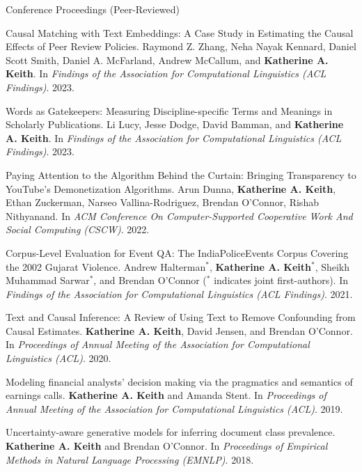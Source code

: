 \documentclass{resume} %
\begin{document}
\begin{rSection}{Conference Proceedings (Peer-Reviewed)}
\begin{etaremune}

\item Causal Matching with Text Embeddings: A Case Study in Estimating the Causal Effects of Peer Review Policies.
    Raymond Z. Zhang, Neha Nayak Kennard, 
    Daniel Scott Smith, Daniel A. McFarland, 
    Andrew McCallum, and \textbf{Katherine A. Keith}.
    In \emph{Findings of the Association for Computational Linguistics (ACL Findings)}. 2023.

\item Words as Gatekeepers: Measuring Discipline-specific
    Terms and Meanings in Scholarly Publications.
    Li Lucy, Jesse Dodge, David Bamman, and \textbf{Katherine A. Keith}.
    In \emph{Findings of the Association for Computational Linguistics (ACL Findings)}. 2023.

\item Paying Attention to the Algorithm Behind the Curtain: Bringing Transparency to YouTube's Demonetization Algorithms.
    Arun Dunna, \textbf{Katherine A. Keith}, Ethan Zuckerman, Narseo Vallina-Rodriguez, Brendan O'Connor, Rishab Nithyanand. 
    In \emph{ACM Conference On Computer-Supported Cooperative Work And Social Computing (CSCW)}. 2022. 

\item Corpus-Level Evaluation for Event QA: The IndiaPoliceEvents Corpus Covering the 2002 Gujarat Violence. Andrew Halterman$^*$, \textbf{Katherine A. Keith}$^*$, Sheikh Muhammad Sarwar$^*$, and Brendan O'Connor ($^*$ indicates joint first-authors).  In \emph{Findings of the Association for Computational Linguistics (ACL Findings)}. 2021.

\item Text and Causal Inference: A Review of Using Text to Remove Confounding from Causal Estimates. \textbf{Katherine A. Keith}, David Jensen, and Brendan O'Connor. In \emph{Proceedings of Annual Meeting of the Association for Computational Linguistics (ACL)}. 2020.  

\item Modeling financial analysts' decision making via the pragmatics and semantics of earnings calls. 
\textbf{Katherine A. Keith} and Amanda Stent. 
In \emph{Proceedings of Annual Meeting of the Association for Computational Linguistics (ACL)}.  2019. 

\item Uncertainty-aware generative models for inferring document class prevalence.
\textbf{Katherine A. Keith} and Brendan O'Connor. 
In \emph{Proceedings of Empirical Methods in Natural Language Processing (EMNLP)}. 2018. 


\end{etaremune}
\end{rSection}
\end{document}
